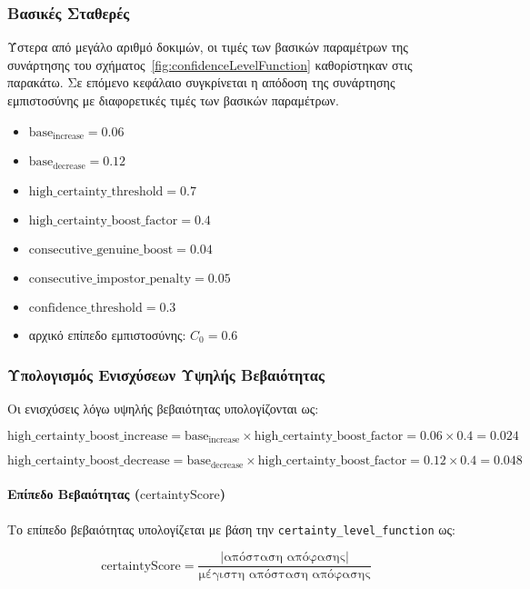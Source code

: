 \subsubsection{Βασικές Σταθερές}
Ύστερα από μεγάλο αριθμό δοκιμών, οι τιμές των βασικών παραμέτρων της συνάρτησης του σχήματος~\ref{fig:confidenceLevelFunction} καθορίστηκαν στις παρακάτω. Σε επόμενο κεφάλαιο συγκρίνεται η απόδοση της συνάρτησης εμπιστοσύνης με διαφορετικές τιμές των βασικών παραμέτρων.

\begin{itemize}
    \item $\text{base}_{\text{increase}} = 0.06$
    \item $\text{base}_{\text{decrease}} = 0.12$
    \item $\text{high\_certainty\_threshold} = 0.7$
    \item $\text{high\_certainty\_boost\_factor} = 0.4$
    \item $\text{consecutive\_genuine\_boost} = 0.04$
    \item $\text{consecutive\_impostor\_penalty} = 0.05$
    \item $\text{confidence\_threshold} = 0.3$
    \item αρχικό επίπεδο εμπιστοσύνης: $C_0 = 0.6$
\end{itemize}

\subsubsection{Υπολογισμός Ενισχύσεων Υψηλής Βεβαιότητας}

Οι ενισχύσεις λόγω υψηλής βεβαιότητας υπολογίζονται ως:

\[
\text{high\_certainty\_boost\_increase} = \text{base}_{\text{increase}} \times \text{high\_certainty\_boost\_factor} = 0.06 \times 0.4 = 0.024
\]

\[
\text{high\_certainty\_boost\_decrease} = \text{base}_{\text{decrease}} \times \text{high\_certainty\_boost\_factor} = 0.12 \times 0.4 = 0.048
\]

\paragraph{Επίπεδο Βεβαιότητας ($\text{certaintyScore}$)}

Το επίπεδο βεβαιότητας υπολογίζεται με βάση την \texttt{certainty\_level\_function} ως:

\[
\text{certaintyScore} = \frac{\lvert \text{απόσταση απόφασης} \rvert}{\text{μέγιστη απόσταση απόφασης}}
\]

